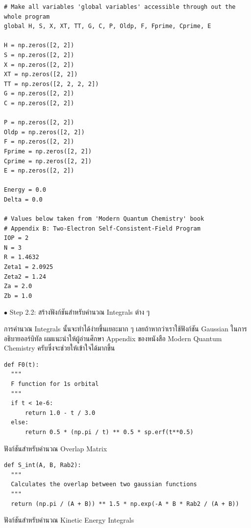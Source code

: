 \begin{lstlisting}[style=MyPython]
# Make all variables 'global variables' accessible through out the whole program
global H, S, X, XT, TT, G, C, P, Oldp, F, Fprime, Cprime, E

H = np.zeros([2, 2])
S = np.zeros([2, 2])
X = np.zeros([2, 2])
XT = np.zeros([2, 2])
TT = np.zeros([2, 2, 2, 2])
G = np.zeros([2, 2])
C = np.zeros([2, 2])

P = np.zeros([2, 2])
Oldp = np.zeros([2, 2])
F = np.zeros([2, 2])
Fprime = np.zeros([2, 2])
Cprime = np.zeros([2, 2])
E = np.zeros([2, 2])

Energy = 0.0
Delta = 0.0

# Values below taken from 'Modern Quantum Chemistry' book
# Appendix B: Two-Electron Self-Consistent-Field Program
IOP = 2
N = 3
R = 1.4632
Zeta1 = 2.0925
Zeta2 = 1.24
Za = 2.0
Zb = 1.0
\end{lstlisting}

\vspace{5pt}

\noindent $\bullet$ Step 2.2: สร้างฟังก์ชันสำหรับคำนวณ Integrals ต่าง ๆ

การคำนวณ Integrals นั้นจะทำได้ง่ายขึ้นเยอะมาก ๆ เลยถ้าหากว่าเราใช้ฟังก์ชัน Gaussian ในการอธิบายออร์บิทัล ผมแนะนำให้ผู้อ่านศึกษา
Appendix ของหนังสือ Modern Quantum Chemistry ครับซึ่งจะช่วยให้เข้าใจได้มากขึ้น

\vspace{5pt}

\begin{lstlisting}[style=MyPython]
def F0(t):
  """
  F function for 1s orbital
  """
  if t < 1e-6:
      return 1.0 - t / 3.0
  else:
      return 0.5 * (np.pi / t) ** 0.5 * sp.erf(t**0.5)
\end{lstlisting}

\vspace{5pt}

\noindent ฟังก์ชันสำหรับคำนวณ Overlap Matrix

\vspace{5pt}

\begin{lstlisting}[style=MyPython]
def S_int(A, B, Rab2):
  """
  Calculates the overlap between two gaussian functions
  """
  return (np.pi / (A + B)) ** 1.5 * np.exp(-A * B * Rab2 / (A + B))
\end{lstlisting}

\vspace{5pt}

\noindent ฟังก์ชันสำหรับคำนวณ Kinetic Energy Integrals

